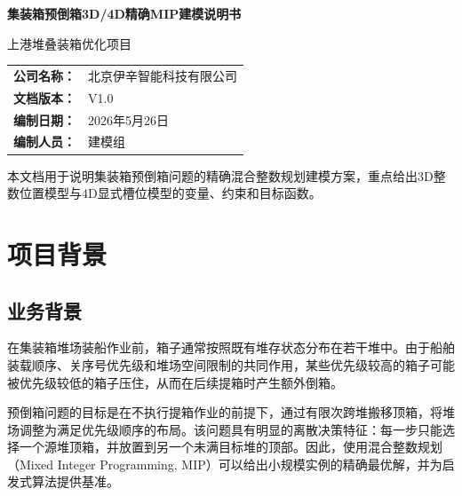 \documentclass[11pt,a4paper]{ctexart}
\newcommand{\DocTitle}{集装箱预倒箱3D/4D精确MIP建模说明书}
\newcommand{\ProjectName}{上港堆叠装箱优化项目}
\newcommand{\CompanyName}{北京伊辛智能科技有限公司}
\newcommand{\DocVersion}{V1.0}
\newcommand{\DocDate}{2026年5月26日}
\newcommand{\AuthorName}{建模组}
\begin{document}
\begin{titlepage}
    \centering
    \vspace*{2.5cm}

    {\Huge\bfseries\color{mainblue}\DocTitle\par}
    \vspace{0.8cm}
    {\Large\ProjectName\par}

    \vspace{1.8cm}

    \renewcommand{\arraystretch}{1.5}
    \begin{tabular}{>{\bfseries}r l}
        公司名称： & \CompanyName \\
        文档版本： & \DocVersion \\
        编制日期： & \DocDate \\
        编制人员： & \AuthorName \\
    \end{tabular}

    \vfill

    {\large\color{textgray}
    本文档用于说明集装箱预倒箱问题的精确混合整数规划建模方案，重点给出3D整数位置模型与4D显式槽位模型的变量、约束和目标函数。}

    \vspace{1.2cm}
\end{titlepage}

\tableofcontents
\newpage

\section{项目背景}

\subsection{业务背景}
在集装箱堆场装船作业前，箱子通常按照既有堆存状态分布在若干堆中。由于船舶装载顺序、关序号优先级和堆场空间限制的共同作用，某些优先级较高的箱子可能被优先级较低的箱子压住，从而在后续提箱时产生额外倒箱。

预倒箱问题的目标是在不执行提箱作业的前提下，通过有限次跨堆搬移顶箱，将堆场调整为满足优先级顺序的布局。该问题具有明显的离散决策特征：每一步只能选择一个源堆顶箱，并放置到另一个未满目标堆的顶部。因此，使用混合整数规划（Mixed Integer Programming, MIP）可以给出小规模实例的精确最优解，并为启发式算法提供基准。
\end{document}
